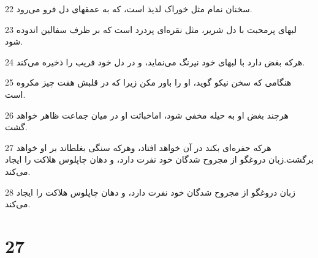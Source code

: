 \par 22 سخنان نمام مثل خوراک لذیذ است، که به عمقهای دل فرو می‌رود.
\par 23 لبهای پرمحبت با دل شریر، مثل نقره‌ای پردرد است که بر ظرف سفالین اندوده شود.
\par 24 هر‌که بغض دارد با لبهای خود نیرنگ می‌نماید، و در دل خود فریب را ذخیره می‌کند.
\par 25 هنگامی که سخن نیکو گوید، او را باور مکن زیرا که در قلبش هفت چیز مکروه است.
\par 26 هر‌چند بغض او به حیله مخفی شود، اماخباثت او در میان جماعت ظاهر خواهد گشت.
\par 27 هر‌که حفره‌ای بکند در آن خواهد افتاد، وهر‌که سنگی بغلطاند بر او خواهد برگشت.زبان دروغگو از مجروح شدگان خود نفرت دارد، و دهان چاپلوس هلاکت را ایجاد می‌کند.
\par 28 زبان دروغگو از مجروح شدگان خود نفرت دارد، و دهان چاپلوس هلاکت را ایجاد می‌کند.
 
\chapter{27}

